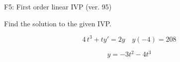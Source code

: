 \begin{exercise}
  \begin{exerciseTitle}F5: First order linear IVP (ver. 95)\end{exerciseTitle}
  \begin{exerciseStatement}
    
Find the solution to the given IVP.

    
\[4 \, t^{3} +ty'= 2 y \hspace{1em} y( -4 ) = 208\]

  \end{exerciseStatement}
  \begin{exerciseAnswer}
    
\[y= -3 t^ 2 -4 t^{3}\]

  \end{exerciseAnswer}
\end{exercise}